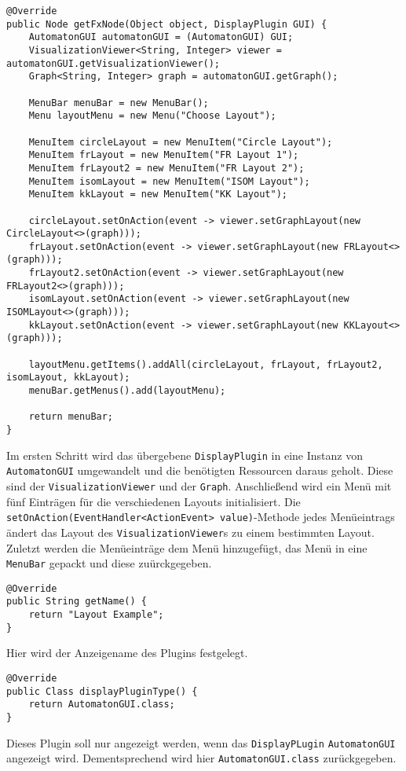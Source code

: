 \begin{lstlisting}[frame=single, basicstyle=\small, caption=Die Methode \textit{getFxNode}]
@Override
public Node getFxNode(Object object, DisplayPlugin GUI) {
	AutomatonGUI automatonGUI = (AutomatonGUI) GUI;
	VisualizationViewer<String, Integer> viewer = automatonGUI.getVisualizationViewer();
	Graph<String, Integer> graph = automatonGUI.getGraph();
	
	MenuBar menuBar = new MenuBar();
	Menu layoutMenu = new Menu("Choose Layout");
	
	MenuItem circleLayout = new MenuItem("Circle Layout");
	MenuItem frLayout = new MenuItem("FR Layout 1");
	MenuItem frLayout2 = new MenuItem("FR Layout 2");
	MenuItem isomLayout = new MenuItem("ISOM Layout");
	MenuItem kkLayout = new MenuItem("KK Layout");
	
	circleLayout.setOnAction(event -> viewer.setGraphLayout(new CircleLayout<>(graph)));
	frLayout.setOnAction(event -> viewer.setGraphLayout(new FRLayout<>(graph)));
	frLayout2.setOnAction(event -> viewer.setGraphLayout(new FRLayout2<>(graph)));
	isomLayout.setOnAction(event -> viewer.setGraphLayout(new ISOMLayout<>(graph)));
	kkLayout.setOnAction(event -> viewer.setGraphLayout(new KKLayout<>(graph)));
	
	layoutMenu.getItems().addAll(circleLayout, frLayout, frLayout2, isomLayout, kkLayout);
	menuBar.getMenus().add(layoutMenu);
	
	return menuBar;
}
\end{lstlisting}
Im ersten Schritt wird das übergebene \lstinline[columns=fixed]{DisplayPlugin} in eine Instanz von \lstinline[columns=fixed]{AutomatonGUI} umgewandelt und die benötigten Ressourcen daraus geholt. Diese sind der \lstinline[columns=fixed]{VisualizationViewer} und der \lstinline[columns=fixed]{Graph}. Anschließend wird ein Menü mit fünf Einträgen für die verschiedenen Layouts initialisiert. Die \lstinline[columns=fixed]{setOnAction(EventHandler<ActionEvent> value)}-Methode jedes Menüeintrags ändert das Layout des \lstinline[columns=fixed]{VisualizationViewer}s zu einem bestimmten Layout. Zuletzt werden die Menüeinträge dem Menü hinzugefügt, das Menü in eine \lstinline[columns=fixed]{MenuBar} gepackt und diese zuürckgegeben.
\begin{lstlisting}[frame=single, basicstyle=\small, caption=Die Methode \textit{getName}]
@Override
public String getName() {
	return "Layout Example";
}
\end{lstlisting}
Hier wird der Anzeigename des Plugins festgelegt.
\begin{lstlisting}[frame=single, basicstyle=\small, caption=Die Methode \textit{displayPluginType}]
@Override
public Class displayPluginType() {
	return AutomatonGUI.class;
}
\end{lstlisting}
Dieses Plugin soll nur angezeigt werden, wenn das \lstinline[columns=fixed]{DisplayPLugin} \lstinline[columns=fixed]{AutomatonGUI} angezeigt wird. Dementsprechend wird hier \lstinline[columns=fixed]{AutomatonGUI.class} zurückgegeben.
